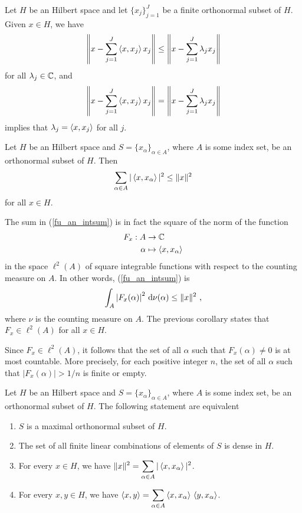 \begin{theorem}
Let $H$ be an Hilbert space and let $\displaystyle \{x_j\}_{j=1}^J$ be a finite
orthonormal subset of $H$.  Given $x\in H$, we have
\[
\left\| x - \sum_{j=1}^J \left\langle{x} , {x_j}\right\rangle x_j \right\| 
\leq \left\| x - \sum_{j=1}^J \lambda_j x_j \right\|
\]
for all $\lambda_j \in \mathbb{C}$, and
\[
\left\| x - \sum_{j=1}^J \left\langle{x} , {x_j}\right\rangle x_j \right\| 
= \left\| x - \sum_{j=1}^J \lambda_j x_j \right\|
\]
implies that $\lambda_j = \left\langle{x} , {x_j}\right\rangle$ for all $j$.
\end{theorem}

\begin{cor}
Let $H$ be an Hilbert space and
$\displaystyle S = \{ x_\alpha \}_{\alpha \in A}$,
where $A$ is some index set, be an orthonormal subset of $H$.
Then
\begin{equation} \label{fu_an_intsum}
\sum_{\alpha \in A} |\left\langle{x} , {x_\alpha}\right\rangle|^2 \leq \|x\|^2
\end{equation}
for all $x \in H$.
\end{cor}

The sum in (\ref{fu_an_intsum}) is in fact the square of the norm of
the function 
\begin{align*}
F_x:A & \rightarrow \mathbb{C} \\
\alpha &\mapsto \left\langle{x} , {x_\alpha}\right\rangle
\end{align*}
in the space $\displaystyle \ell^2(A)$ of square integrable functions
with respect to the counting measure on $A$.  In other words,
(\ref{fu_an_intsum}) is
\[
\int_A \left| F_x(\alpha)\right|^2\,\mathrm{d}{\nu(\alpha)} \leq \|x\|^2 \ ,
\]
where $\nu$ is the counting measure on $A$.  The previous corollary
states that $\displaystyle F_x \in \ell^2(A)$ for all $x\in H$.

Since $\displaystyle F_x \in \ell^2(A)$, it follows that the set of all $\alpha$
such that $F_x(\alpha) \neq 0$ is at most countable.  More
precisely, for each positive integer $n$, the set of all $\alpha$ such
that $|F_x(\alpha)| > 1/n$ is finite or empty.

\begin{theorem} \label{fu_an_complset}
Let $H$ be an Hilbert space and
$\displaystyle S = \{ x_\alpha \}_{\alpha \in A}$,
where $A$ is some index set, be an orthonormal subset of $H$.
The following statement are equivalent
\begin{enumerate}
\item $S$ is a maximal orthonormal subset of $H$.
\item The set of all finite linear combinations of elements of $S$ is
dense in $H$.
\item For every $x\in H$, we have
$\displaystyle \|x\|^2 = \sum_{\alpha \in A} |\left\langle{x} , {x_\alpha}\right\rangle|^2$.
\item For every $x, y \in H$, we have
$\displaystyle
\left\langle{x} , {y}\right\rangle = \sum_{\alpha \in A} \left\langle{x} , {x_\alpha}\right\rangle\, \left\langle{y} , {x_\alpha}\right\rangle$.
\end{enumerate}
\end{theorem}

